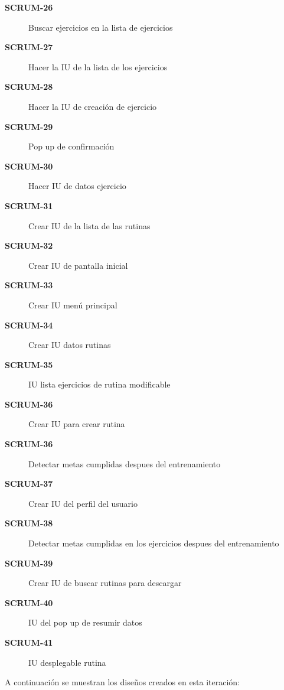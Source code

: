 \begin{description}
  \item[\textbf{SCRUM-26}] Buscar ejercicios en la lista de ejercicios
  \item[\textbf{SCRUM-27}] Hacer la IU de la lista de los ejercicios
  \item[\textbf{SCRUM-28}] Hacer la IU de creación de ejercicio
  \item[\textbf{SCRUM-29}] Pop up de confirmación
  \item[\textbf{SCRUM-30}] Hacer IU de datos ejercicio
  \item[\textbf{SCRUM-31}] Crear IU de la lista de las rutinas
  \item[\textbf{SCRUM-32}] Crear IU de pantalla inicial
  \item[\textbf{SCRUM-33}] Crear IU menú principal
  \item[\textbf{SCRUM-34}] Crear IU datos rutinas
  \item[\textbf{SCRUM-35}] IU lista ejercicios de rutina modificable
  \item[\textbf{SCRUM-36}] Crear IU para crear rutina
  \item[\textbf{SCRUM-36}] Detectar metas cumplidas despues del entrenamiento
  \item[\textbf{SCRUM-37}] Crear IU del perfil del usuario
  \item[\textbf{SCRUM-38}] Detectar metas cumplidas en los ejercicios despues del entrenamiento
  \item[\textbf{SCRUM-39}] Crear IU de buscar rutinas para descargar
  \item[\textbf{SCRUM-40}] IU del pop up de resumir datos
  \item[\textbf{SCRUM-41}] IU desplegable rutina
  
\end{description}

A continuación se muestran los diseños creados en esta iteración:

